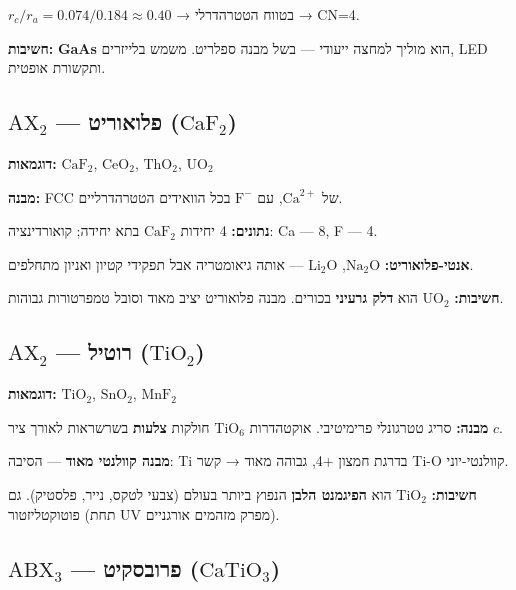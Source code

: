 \documentclass[
  hebrew,
  letterpaper,
  DIV=11,
  numbers=noendperiod]{scrreprt}
\begin{document}
\(r_c/r_a = 0.074/0.184 \approx 0.40\) → בטווח הטטרהדרלי → CN=4.

\textbf{חשיבות:} \textbf{GaAs} הוא מוליך למחצה ייעודי --- בשל מבנה
ספלריט. משמש בלייזרים, LED ותקשורת אופטית.

\subsection{\texorpdfstring{\(\text{AX}_2\) --- פלואוריט
(\(\text{CaF}_2\))}{\textbackslash text\{AX\}\_2 --- פלואוריט (\textbackslash text\{CaF\}\_2)}}\label{textax_2-ux5e4ux5dcux5d5ux5d0ux5d5ux5e8ux5d9ux5d8-textcaf_2}

\textbf{דוגמאות:} \(\text{CaF}_2\), \(\text{CeO}_2\), \(\text{ThO}_2\),
\(\text{UO}_2\)

\textbf{מבנה:} FCC של \(\text{Ca}^{2+}\), עם \(\text{F}^-\) בכל הוואידים
הטטרהדרליים.

\textbf{נתונים:} 4 יחידות \(\text{CaF}_2\) בתא יחידה; קואורדינציה: Ca
--- 8, F --- 4.

\textbf{אנטי-פלואוריט:} \(\text{Na}_2\text{O}\), \(\text{Li}_2\text{O}\)
--- אותה גיאומטריה אבל תפקידי קטיון ואניון מתחלפים.

\textbf{חשיבות:} \(\text{UO}_2\) הוא \textbf{דלק גרעיני} בכורים. מבנה
פלואוריט יציב מאוד וסובל טמפרטורות גבוהות.

\subsection{\texorpdfstring{\(\text{AX}_2\) --- רוטיל
(\(\text{TiO}_2\))}{\textbackslash text\{AX\}\_2 --- רוטיל (\textbackslash text\{TiO\}\_2)}}\label{textax_2-ux5e8ux5d5ux5d8ux5d9ux5dc-texttio_2}

\textbf{דוגמאות:} \(\text{TiO}_2\), \(\text{SnO}_2\), \(\text{MnF}_2\)

\textbf{מבנה:} סריג טטרגונלי פרימיטיבי. אוקטהדרות \(\text{TiO}_6\)
חולקות \textbf{צלעות} בשרשראות לאורך ציר \(c\).

\textbf{מבנה קוולנטי מאוד} --- הסיבה: Ti בדרגת חמצון +4, גבוהה מאוד →
קשר Ti-O קוולנטי-יוני.

\textbf{חשיבות:} \(\text{TiO}_2\) הוא \textbf{הפיגמנט הלבן} הנפוץ ביותר
בעולם (צבעי לטקס, נייר, פלסטיק). גם פוטוקטליזטור (תחת UV מפרק מזהמים
אורגניים).

\subsection{\texorpdfstring{\(\text{ABX}_3\) --- פרובסקיט
(\(\text{CaTiO}_3\))}{\textbackslash text\{ABX\}\_3 --- פרובסקיט (\textbackslash text\{CaTiO\}\_3)}}\label{textabx_3-ux5e4ux5e8ux5d5ux5d1ux5e1ux5e7ux5d9ux5d8-textcatio_3}
\end{document}
